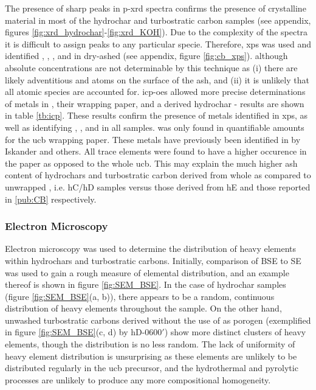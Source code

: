 The presence of sharp peaks in \acrshort{p-xrd} spectra confirms the presence of crystalline material in most of the \gls{hydrochar} and \gls{turbostratic carbon} samples (see appendix, figures \ref{fig:xrd_hydrochar}-\ref{fig:xrd_KOH}). Due to the complexity of the spectra it is difficult to assign peaks to any particular specie. Therefore, \acrshort{xps} was used and identified , , , and  in dry-ashed  (see appendix, figure \ref{fig:cb_xps}). although absolute concentrations are not determinable by this technique as (i) there are likely adventitious  and  atoms on the surface of the ash, and (ii) it is unlikely that all atomic species are accounted for. \acrshort{icp-oes} allowed more precise determinations of metals in , their wrapping paper, and a derived \gls{hydrochar} - results are shown in table \ref{tb:icp}. These results confirm the presence of metals identified in \acrshort{xps}, as well as identifying , , and  in all samples.  was only found in quantifiable amounts for the \acrshort{ucb} wrapping paper. These metals have previously been identified in  by Iskander and others.\citep{chevalier2018nano, cardoso2018exposure, iskander1992multielement, jenkins1985neutron} All trace elements were found to have a higher occurence in the paper as opposed to the whole \acrshort{ucb}. This may explain the much higher \gls{ash content} of \glspl{hydrochar} and \gls{turbostratic carbon} derived from whole  as compared to unwrapped , i.e. hC/hD  samples versus those derived from hE and those reported in \ref{pub:CB} respectively. 

\subsubsection{Electron Microscopy}

Electron microscopy was used to determine the distribution of heavy elements within \glspl{hydrochar} and \glspl{turbostratic carbon}. Initially, comparison of BSE to SE was used to gain a rough measure of elemental distribution, and an example thereof is shown in figure \ref{fig:SEM_BSE}. In the case of \gls{hydrochar} samples (figure \ref{fig:SEM_BSE}(a, b)), there appears to be a random, continuous distribution of heavy elements throughout the sample. On the other hand, unwashed \glspl{turbostratic carbon} derived without the use of  as \gls{porogen} (exemplified in figure \ref{fig:SEM_BSE}(c, d) by hD-0600$'$) show more distinct clusters of heavy elements, though the distribution is no less random. The lack of uniformity of heavy element distribution is unsurprising as these elements are unlikely to be distributed regularly in the \acrshort{ucb} precursor, and the hydrothermal and pyrolytic processes are unlikely to produce any more compositional homogeneity. 

